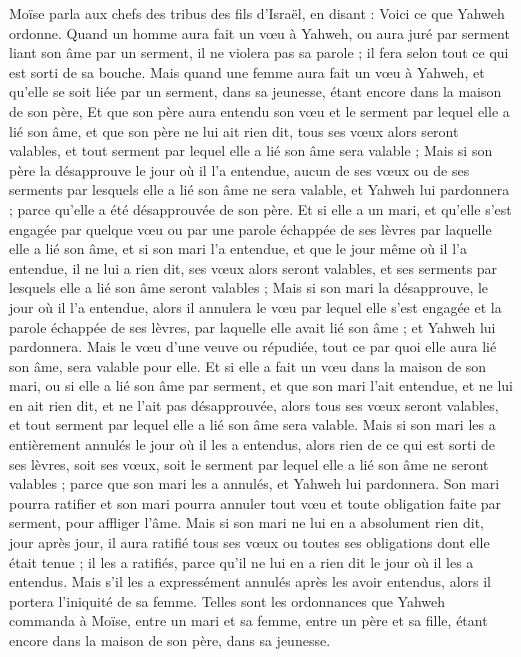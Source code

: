 \begin{multicols}{2}
Moïse parla aux chefs des tribus des fils d'Israël, en disant : Voici ce que Yahweh ordonne.
Quand un homme aura fait un vœu à Yahweh, ou aura juré par serment liant son âme par un serment, il ne violera pas sa parole ; il fera selon tout ce qui est sorti de sa bouche.
Mais quand une femme aura fait un vœu à Yahweh, et qu’elle se soit liée par un serment, dans sa jeunesse, étant encore dans la maison de son père,
Et que son père aura entendu son vœu et le serment par lequel elle a lié son âme, et que son père ne lui ait rien dit, tous ses vœux alors seront valables, et tout serment par lequel elle a lié son âme sera valable ;
Mais si son père la désapprouve le jour où il l’a entendue, aucun de ses vœux ou de ses serments par lesquels elle a lié son âme ne sera valable, et Yahweh lui pardonnera ; parce qu’elle a été désapprouvée de son père.
Et si elle a un mari, et qu’elle s’est engagée par quelque vœu ou par une parole échappée de ses lèvres par laquelle elle a lié son âme,
et si son mari l’a entendue, et que le jour même où il l’a entendue, il ne lui a rien dit, ses vœux alors seront valables, et ses serments par lesquels elle a lié son âme seront valables ;
Mais si son mari la désapprouve, le jour où il l'a entendue, alors il annulera le vœu par lequel elle s’est engagée et la parole échappée de ses lèvres, par laquelle elle avait lié son âme ; et Yahweh lui pardonnera.
Mais le vœu d’une veuve ou répudiée, tout ce par quoi elle aura lié son âme, sera valable pour elle.
Et si elle a fait un vœu dans la maison de son mari, ou si elle a lié son âme par serment,
et que son mari l’ait entendue, et ne lui en ait rien dit, et ne l’ait pas désapprouvée, alors tous ses vœux seront valables, et tout serment par lequel elle a lié son âme sera valable.
Mais si son mari les a entièrement annulés le jour où il les a entendus, alors rien de ce qui est sorti de ses lèvres, soit ses vœux, soit le serment par lequel elle a lié son âme ne seront valables ; parce que son mari les a annulés, et Yahweh lui pardonnera.
Son mari pourra ratifier et son mari pourra annuler tout vœu et toute obligation faite par serment, pour affliger l’âme.
Mais si son mari ne lui en a absolument rien dit, jour après jour, il aura ratifié tous ses vœux ou toutes ses obligations dont elle était tenue ; il les a ratifiés, parce qu’il ne lui en a rien dit le jour où il les a entendus.
Mais s’il les a expressément annulés après les avoir entendus, alors il portera l’iniquité de sa femme.
Telles sont les ordonnances que Yahweh commanda à Moïse, entre un mari et sa femme, entre un père et sa fille, étant encore dans la maison de son père, dans sa jeunesse.

\end{multicols}
